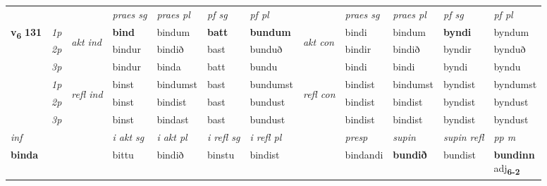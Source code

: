\begin{longtable}[l]{X>{\footnotesize\itshape}llXXXXlXXXX}
\midrule

 & &   & \textit{praes sg}  & \textit{praes pl}    & \textit{ pf sg} & \textit{pf pl} & & \textit{praes sg}  & \textit{praes pl}    & \textit{pf sg} & \textit{pf pl }  \\ \cmidrule{4-7} \cmidrule{9-12}
 \multirow{2}{*}{{{\textbf{v{\textsubscript{6}}} \Large{\textbf{131}}}}}  & 1p & \multirow{3}{*}{\begin{turn}{90}\textit{akt ind}\end{turn}} & \textbf{bind} & bindum & \textbf{batt} & \textbf{bundum} & \multirow{3}{*}{\begin{turn}{90}\textit{akt con}\end{turn}} &bindi & bindum & \textbf{byndi} & byndum\\*
 & 2p &  &  bindur  & bindið & bast & bunduð & & bindir & bindið & byndir & bynduð \\*
 & 3p &  & bindur & binda & batt & bundu & & bindi & bindi& byndi & byndu \\*
\cmidrule{4-7} \cmidrule{9-12}
 & 1p & \multirow{3}{*}{\begin{turn}{90}\textit{refl ind}\end{turn}}  & binst & bindumst & bast & bundumst & \multirow{3}{*}{\begin{turn}{90}\textit{refl con}\end{turn}}  &bindist & bindumst & byndist & byndumst \\*
 & 2p &  & binst & bindist & bast & bundust & &bindist & bindist & byndist & byndust \\*
 & 3p  & & binst & bindast & bast & bundust & & bindist & bindist& byndist & byndust \\*
\cmidrule{4-7} \cmidrule{9-12}

   {\textit{inf}} & &  & \textit{i akt sg} & \textit{i akt pl} & \textit{i refl sg} & \textit{i refl pl} && \textit{presp} & \textit{supin} & \textit{supin refl} & \textit{pp m} \\*
  {\textbf{binda}} & && bittu  & bindið & binstu & bindist && bindandi &  \textbf{bundið} & bundist & \specialcell{\textbf{bundinn} \\ adj\textbf{\textsubscript{6-2}}} \\*

\midrule


\end{longtable}
